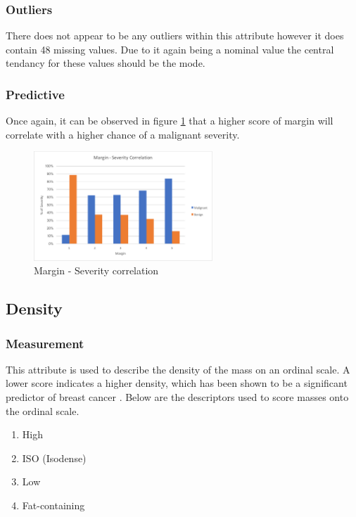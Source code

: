 \documentclass[12pt]{article}
\begin{document}
      \subsubsection{Outliers}
        There does not appear to be any outliers within this attribute however it does contain 48 missing values. Due to it again being a nominal value the central tendancy for these values should be the mode.

      \subsubsection{Predictive}
        Once again, it can be observed in figure \ref{fig:margin-severity-correlation} that a higher score of margin will correlate with a higher chance of a malignant severity.

        \begin{figure}[H]
          \centering
          \includegraphics[width=0.6\textwidth]{margin-severity-correlation}
          \caption{Margin - Severity correlation}
          \label{fig:margin-severity-correlation}
        \end{figure}

    \subsection{Density}
      \subsubsection{Measurement}
        This attribute is used to describe the density of the mass on an ordinal scale. A lower score indicates a higher density, which has been shown to be a significant predictor of breast cancer \citep{woods2011mammographic}. Below are the descriptors used to score masses onto the ordinal scale.

        \singlespacing
        \begin{enumerate}[label=\arabic*)]
          \item High
          \item ISO (Isodense)
          \item Low
          \item Fat-containing
        \end{enumerate}
        \doublespacing
\end{document}
